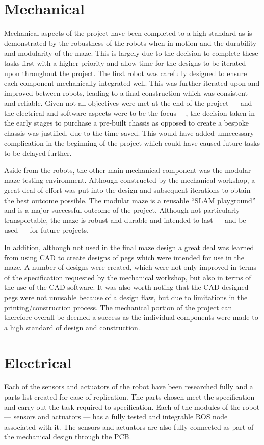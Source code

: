 \section{Mechanical}\label{eval/mech} 
Mechanical aspects of the project have been completed to a 
high standard as is demonstrated by the robustness of the robots when in 
motion and the durability and modularity of the maze. This is largely due to the 
decision to complete these tasks first with a higher priority and allow time for the 
designs to be iterated upon throughout the project. The first robot was carefully 
designed to ensure each component mechanically integrated well. This was further 
iterated upon and improved between robots, leading to a final construction which was 
consistent and reliable. Given not all objectives were met at the end of the project 
--- and the electrical and software aspects were to be the focus ---, the decision taken in the 
early stages to purchase a pre-built chassis as opposed to create a bespoke chassis 
was justified, due to the time saved. This would have added unnecessary complication 
in the beginning of the project which could have caused future 
tasks to be delayed further. 

Aside from the robots, the other main mechanical component was the modular maze 
testing environment. Although constructed by the mechanical workshop, a great deal of 
effort was put into the design and subsequent iterations to obtain the best outcome 
possible. The modular maze is a reusable ``SLAM playground'' and is a major 
successful outcome of the project. Although not particularly transportable, the maze 
is robust and durable and intended to last --- and be used --- for future projects.

In addition, although not used in the final maze design a great deal was learned from 
using CAD to create designs of pegs which were intended for use in the maze. A number 
of designs were created, which were not only improved in terms of the specification 
requested by the mechanical workshop, but also in terms of the use of the CAD 
software. It was also worth noting that the CAD designed pegs were not unusable because of a design flaw, but due to limitations in the printing/construction process. The mechanical portion of the project can therefore overall be deemed a success as 
the individual components were made to a high standard of design and construction. 

\section{Electrical}\label{eval/elec}
Each of the sensors and actuators of the robot have been researched fully and a 
parts list created for ease of replication. The parts chosen meet the 
specification and carry out the task required to specification. 
Each of the modules of the robot --- sensors and actuators --- has a fully 
tested and integrable ROS node associated with it. The sensors and actuators are 
also fully connected as part of the mechanical design through the PCB. 

